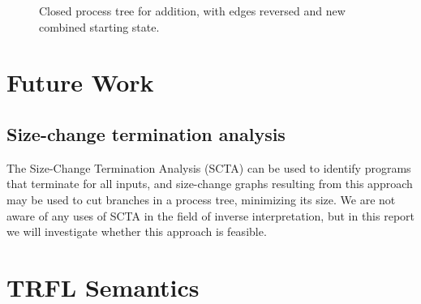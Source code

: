 \documentclass[10pt]{../sigplanconf}
\newcommand{\gen}{\ensuremath{~{\leq\kern-6pt \raisebox{1pt}{$\cdot$}}~}}
\begin{document}
\begin{figure*}
\caption{Closed process tree for addition, with edges reversed and new
  combined starting state.}
  \label{fig:addtree}
\end{figure*}


\section{Future Work}
\subsection{Size-change termination analysis}
  The Size-Change Termination Analysis (SCTA)\cite{lee2001size} can be
  used to identify programs that terminate for all inputs, and
  size-change graphs resulting from this approach may be used to cut
  branches in a process tree, minimizing its size. We are not aware of
  any uses of SCTA in the field of inverse interpretation, but in this
  report we will investigate whether this approach is feasible.







\appendix
\section{TRFL Semantics}
\label{sec:semantics}
\end{document}
